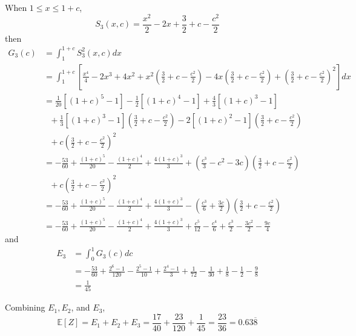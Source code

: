 \documentclass[12pt]{simple_doc}
\begin{document}
    When $1 \leqslant x \leqslant 1 + c$,
    \begin{equation*}
        S_3(x, c) = \frac{x^2}{2} - 2x + \frac{3}{2} + c - \frac{c^2}{2}
    \end{equation*}
    then
    \begin{equation*}
		\begin{aligned}
		G_3(c) &= \int_1^{1+c} S_3^2(x, c) dx \\
		   &= \int_1^{1+c} [\frac{x^4}{4} - 2x^3 + 4x^2 + x^2(\frac{3}{2} + c - \frac{c^2}{2})
              -4x(\frac{3}{2} + c - \frac{c^2}{2}) + (\frac{3}{2} + c - \frac{c^2}{2})^2] dx\\
           &= \frac{1}{20}[(1+c)^5 - 1] - \frac{1}{2}[(1+c)^4 - 1] + \frac{4}{3}[(1+c)^3 - 1]\\
           &\ \ \ + \frac{1}{3}[(1+c)^3 - 1](\frac{3}{2} + c - \frac{c^2}{2})
              - 2[(1+c)^2 - 1](\frac{3}{2} + c - \frac{c^2}{2})\\
           &\ \ \ + c(\frac{3}{2} + c - \frac{c^2}{2})^2\\
           &= -\frac{53}{60} + \frac{(1+c)^5}{20} - \frac{(1+c)^4}{2} + \frac{4(1+c)^3}{3}
              + (\frac{c^3}{3} - c^2 -3c)(\frac{3}{2} + c - \frac{c^2}{2})\\
           &\ \ \ + c(\frac{3}{2} + c - \frac{c^2}{2})^2\\
           &= -\frac{53}{60} + \frac{(1+c)^5}{20} - \frac{(1+c)^4}{2} + \frac{4(1+c)^3}{3}
              - (\frac{c^3}{6} + \frac{3c}{2})(\frac{3}{2} + c - \frac{c^2}{2})\\
           &= -\frac{53}{60} + \frac{(1+c)^5}{20} - \frac{(1+c)^4}{2} + \frac{4(1+c)^3}{3}
              + \frac{c^5}{12} - \frac{c^4}{6} + \frac{c^3}{2} - \frac{3c^2}{2} - \frac{9c}{4}
		\end{aligned}
	\end{equation*}
    and
    \begin{equation*}
		\begin{aligned}
		E_3 &= \int_0^1 G_3(c) dc \\
		   &= -\frac{53}{60} + \frac{2^6-1}{120} - \frac{2^5-1}{10} + \frac{2^4-1}{3}
                + \frac{1}{72} - \frac{1}{30} + \frac{1}{8} - \frac{1}{2} - \frac{9}{8} \\
           &= \frac{1}{45}
		\end{aligned}
	\end{equation*}

    Combining $E_1, E_2$, and $E_3$,
    \begin{equation*}
        \mathbb{E}[Z] = E_1 + E_2 + E_3 = \frac{17}{40} + \frac{23}{120} + \frac{1}{45}
                      = \frac{23}{36} = 0.63\overline{8}
    \end{equation*}
\end{document}
